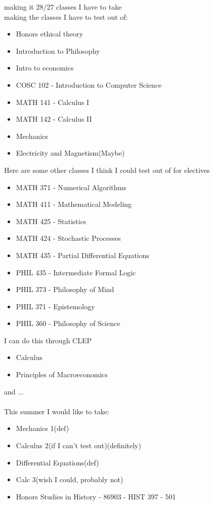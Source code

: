 making it 28/27 classes I have to take
\\
making the classes I have to test out of:
\begin{itemize}
    \item Honors ethical theory
    \item Introduction to Philosophy
    \item Intro to economics 
    \item COSC 102 - Introduction to Computer Science 
    \item MATH 141 - Calculus I 
    \item MATH 142 - Calculus II 
    \item Mechanics
    \item Electricity and Magnetism(Maybe)
\end{itemize}
Here are some other classes I think I could test out of for electives
\begin{itemize}
    \item MATH 371 - Numerical Algorithms
    \item MATH 411 - Mathematical Modeling
    \item MATH 425 - Statistics
    \item MATH 424 - Stochastic Processes
    \item MATH 435 - Partial Differential Equations
    \item PHIL 435 - Intermediate Formal Logic
    \item PHIL 373 - Philosophy of Mind
    \item PHIL 371 - Epistemology
    \item PHIL 360 - Philosophy of Science
\end{itemize}
I can do this through CLEP 
\begin{itemize}
    \item Calculus
    \item Principles of Macroeconomics
\end{itemize}
and ...
\\
\\
This summer I would like to take:
\begin{itemize}
    \item Mechanics 1(def)
    \item Calculus 2(if I can't test out)(definitely)
    \item Differential Equations(def)
    \item Calc 3(wish I could, probably not)
    \item Honors Studies in History - 86903 - HIST 397 - 501
\end{itemize}

